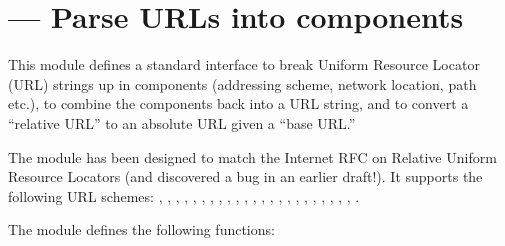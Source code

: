 \section{ ---
         Parse URLs into components}




This module defines a standard interface to break Uniform Resource
Locator (URL) strings up in components (addressing scheme, network
location, path etc.), to combine the components back into a URL
string, and to convert a ``relative URL'' to an absolute URL given a
``base URL.''

The module has been designed to match the Internet RFC on Relative
Uniform Resource Locators (and discovered a bug in an earlier
draft!). It supports the following URL schemes:
, , , , , 
, , , , , 
, , , , , 
, , , , , , 
, , .


The  module defines the following functions:

